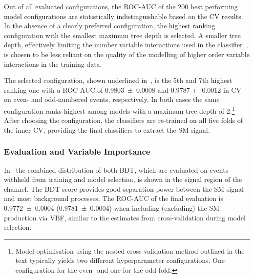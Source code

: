 Out of all evaluated configurations, the ROC-AUC of the 200 best
performing model configurations are statistically indistinguishable
based on the CV results. In the absence of a clearly preferred
configuration, the highest ranking configuration with the smallest
maximum tree depth is selected. A smaller tree depth, effectively
limiting the number variable interactions used in the
classifier~\cite{hastie09}, is chosen to be less reliant on the
quality of the modelling of higher order variable interactions in the
training data.

The selected configuration, shown underlined
in~, is the 5th and 7th highest
ranking one with a ROC-AUC of \num{0.9803 +- 0.0008} and \num{0.9787
  +- 0.0012} in CV on even- and odd-numbered events, respectively. In
both cases the same configuration ranks highest among models with a
maximum tree depth of 2.\footnote{Model optimisation using the nested
  cross-validation method outlined in the text typically yields two
  different hyperparameter configurations. One configuration for the
  even- and one for the odd-fold.} After choosing the configuration,
the classifiers are re-trained on all five folds of the inner CV,
providing the final classifiers to extract the SM \HH signal.




\subsubsection{Evaluation and Variable Importance}%
\label{sec:bdt_performance}

In~ the combined distribution of both BDT,
which are evaluated on events withheld from training and model
selection, is shown in the signal region of the \hadhad channel. The
BDT score provides good separation power between the SM \HH signal and
most background processes. The ROC-AUC of the final evaluation is
\num{0.9772 +- 0.0004} (\num{0.9781 +- 0.0004}) when including
(excluding) the SM \HH production via VBF, similar to the estimates
from cross-validation during model selection.

